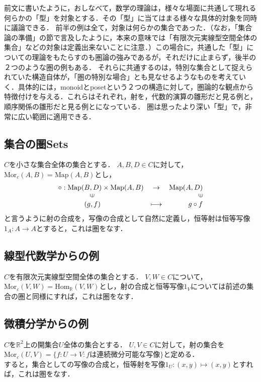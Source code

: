 \documentclass[uplatex, 12pt, dvipdfmx]{jsreport}
\begin{document}
前文に書いたように，おしなべて，数学の理論は，様々な場面に共通して現れる何らかの「型」を対象とする．その「型」に当てはまる様々な具体的対象を同時に議論できる．
前半の例は全て，対象は何らかの集合であった．（なお，「集合論の準備」の節で言及したように，本来の意味では「有限次元実線型空間全体の集合」などの対象は定義出来ないことに注意．）この場合に，共通した「型」についての理論をもたらすのも圏論の強みであるが，それだけに止まらず，後半の２つのような圏の例もある．
それらに共通するのは，特別な集合として捉えられていた構造自体が，「圏の特別な場合」とも見なせるようなものを考えていく．具体的には，monoidとposetという２つの構造に対して，圏論的な観点から特徴付けを与える．これらはそれぞれ，射を，代数的演算の雛形だと見る例と，順序関係の雛形だと見る例とになっている．
圏は思ったより深い「型」で，非常に広い範囲に適用できる．

\subsection{集合の圏\bf{Sets}}

$C$を小さな集合全体の集合とする．
$A,B,D\in C$に対して，$\mathrm{Mor}_c(A,B)=\mathrm{Map}(A,B)$とし，$$\begin{array}{lcr}\circ : \mathrm{Map}(B,D)\times\mathrm{Map}(A,B)&\rightarrow&\mathrm{Map}(A,D)\\ \hspace{16mm}\rotatebox{90}{$\in$} & & \rotatebox{90}{$\in$}\\ \hspace{13mm}(g,f) & \longmapsto & g\circ f \end{array}$$
と言うように射の合成を，写像の合成として自然に定義し，恒等射は恒等写像$1_A:A\rightarrow A$とすると，これは圏をなす．

\subsection{線型代数学からの例}

$C$を有限次元実線型空間全体の集合とする．
$V,W\in C$について，$\mathrm{Mor}_c(V,W)=\mathrm{Hom}_\mathbb{R}(V,W)$とし，射の合成と恒等写像$1_V$については前述の集合の圏と同様にすれば，これは圏をなす．

\subsection{微積分学からの例}

$C$を$\mathbb{R}^2$上の開集合$U$全体の集合とする．
$U,V\in C$に対して，射の集合を$\mathrm{Mor}_c(U,V)=\{f:U\rightarrow V: f\text{は連続微分可能な写像}\}$と定める．\\
すると，集合としての写像の合成と，恒等射を写像$1_U:(x,y)\longmapsto (x,y)$とすれば，これは圏をなす．
\end{document}
